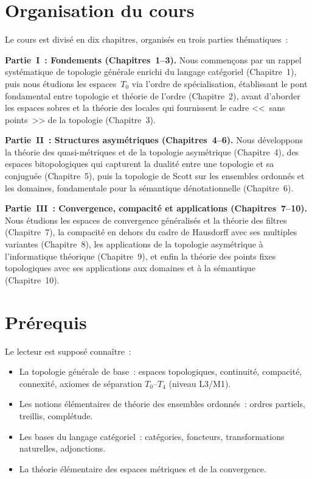 \section*{Organisation du cours}

Le cours est divis\'e en dix chapitres, organis\'es en trois parties th\'ematiques~:

\medskip
\noindent\textbf{Partie~I~: Fondements (Chapitres~1--3).}
Nous commen\c{c}ons par un rappel syst\'ematique de topologie g\'en\'erale enrichi du langage
cat\'egoriel (Chapitre~1), puis nous \'etudions les espaces~$T_0$ via l'ordre de
sp\'ecialisation, \'etablissant le pont fondamental entre topologie et th\'eorie de l'ordre
(Chapitre~2), avant d'aborder les espaces sobres et la th\'eorie des locales qui fournissent
le cadre <<~sans points~>> de la topologie (Chapitre~3).

\medskip
\noindent\textbf{Partie~II~: Structures asym\'etriques (Chapitres~4--6).}
Nous d\'eveloppons la th\'eorie des quasi-m\'etriques et de la topologie asym\'etrique
(Chapitre~4), des espaces bitopologiques qui capturent la dualit\'e entre une topologie et
sa conjugu\'ee (Chapitre~5), puis la topologie de Scott sur les ensembles ordonn\'es et les
domaines, fondamentale pour la s\'emantique d\'enotationnelle (Chapitre~6).

\medskip
\noindent\textbf{Partie~III~: Convergence, compacit\'e et applications (Chapitres~7--10).}
Nous \'etudions les espaces de convergence g\'en\'eralis\'es et la th\'eorie des filtres
(Chapitre~7), la compacit\'e en dehors du cadre de Hausdorff avec ses multiples variantes
(Chapitre~8), les applications de la topologie asym\'etrique \`a l'informatique th\'eorique
(Chapitre~9), et enfin la th\'eorie des points fixes topologiques avec ses applications aux
domaines et \`a la s\'emantique (Chapitre~10).

\section*{Pr\'erequis}

Le lecteur est suppos\'e conna\^itre~:
\begin{itemize}
  \item La topologie g\'en\'erale de base~: espaces topologiques, continuit\'e, compacit\'e,
    connexit\'e, axiomes de s\'eparation $T_0$--$T_4$ (niveau L3/M1).
  \item Les notions \'el\'ementaires de th\'eorie des ensembles ordonn\'es~: ordres partiels,
    treillis, compl\'etude.
  \item Les bases du langage cat\'egoriel~: cat\'egories, foncteurs, transformations
    naturelles, adjonctions.
  \item La th\'eorie \'el\'ementaire des espaces m\'etriques et de la convergence.
\end{itemize}


